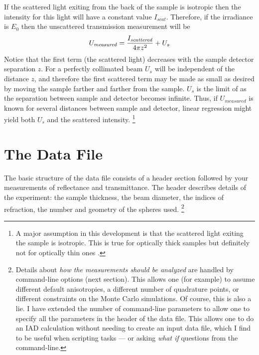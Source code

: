 \documentclass{article}
\begin{document}
If the scattered light exiting from the back of the sample is isotropic
then the intensity  for this light will have a constant value $I_\mathit{scat}$.  
Therefore, if the irradiance is $E_0$ then the unscattered transmission
measurement will be 
$$
U_{\mathit{measured}}=
	{I_{\mathit{scattered}}\over 4\pi z^2 } + U_s
$$
Notice that the first term (the scattered light) decreases with the sample
detector separation $z$. For a perfectly collimated beam $U_s$ will be
independent of the distance $z$, and therefore
the first scattered term may be made as small as desired by moving the sample
farther and farther from the sample. 
$U_s$ is the limit of as the separation between sample and
detector becomes infinite.   Thus, if $U_{\mathit{measured}}$ is known for
several distances between sample and detector, linear regression might
yield both $U_s$ and the scattered intensity.%
\footnote{
A major assumption in this development is that the scattered light
exiting the sample is isotropic.  This is true for optically thick samples
but definitely not for  optically thin ones \cite{jacques87b}.}

\clearpage
\section{The Data File}

The basic structure of the data file consists of a header section followed by your
measurements of reflectance and transmittance.  The header describes
details of the experiment: the sample thickness, the beam diameter, the
indices of refraction, the number and geometry of the spheres used.%
\footnote{Details about \textit{how the measurements should be
analyzed} are handled by command-line options (next section).
This allows one (for example) to assume different default anisotropies, a different
number of quadrature points, or different constraints on the Monte Carlo
simulations.  Of course, this is also a lie.  I have extended the number
of command-line parameters to allow one to specify all the parameters in
the header of the data file.  This allows one to do an IAD calculation
without needing to create an input data file, which I find to be useful
when scripting tasks --- or asking \textit{what if} questions from the
command-line.} 
\end{document}
